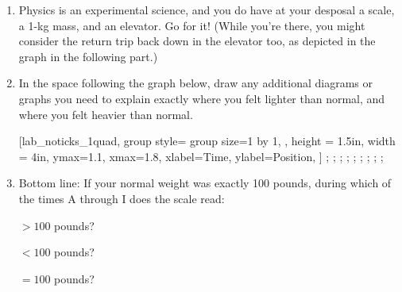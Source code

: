 \begin{enumerate}[labparts]

\item Physics is an experimental science, and you do have at your desposal a scale, a 1-kg mass, and an elevator.  Go for it!  (While you're there, you might consider the return trip back down in the elevator too, as depicted in the graph in the following part.)

\item In the space following the graph below, draw any additional diagrams or graphs you need to explain exactly where you felt lighter than normal, and where you felt heavier than normal.

\medskip
\hspace{0.2in}
\begin{lab_groupplot}{}
					[lab_noticks_1quad,
	group style={
		group size=1 by 1,
		},
	height = {1.5in}, width = {4in},
	ymax=1.1, xmax=1.8,
	xlabel={Time},
	ylabel={Position},
	]
\nextgroupplot[
	xtick={0.1,0.3,0.5,0.7,0.9, 1.1, 1.3, 1.5, 1.7},
	xticklabels={A,B,C,D,E,F,G,H,I},
	]
;
;
;
;
;
;
;
;
;
\end{lab_groupplot}

\vfill

\item Bottom line:  If your normal weight was exactly 100 pounds, during which of the times A through I does the scale read:

\hspace{0.5in} $> 100$ pounds?

\hspace{0.5in} $< 100$ pounds?

\hspace{0.5in} $= 100$ pounds?

\end{enumerate}


